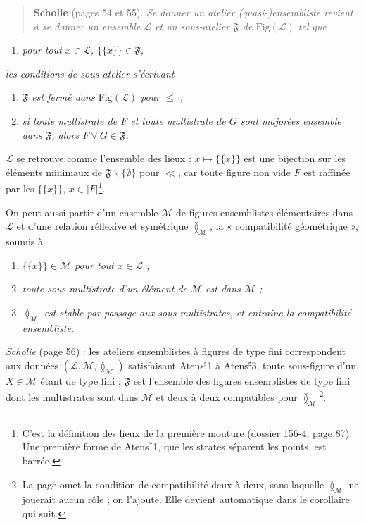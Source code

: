 \documentclass[11pt,a4paper]{article}
\begin{document}
\begin{quote}
\textbf{Scholie} (pages 54 et 55). \emph{Se donner un atelier (quasi-)ensembliste
revient à se donner un ensemble $\mathcal{L}$ et un sous-atelier $\mathfrak{F}$
de $\mathrm{Fig}(\mathcal{L})$ tel que}
\end{quote}
\begin{enumerate}
\item[Atens$^{*}$1] \emph{pour tout $x \in \mathcal{L}$, $\lbrace \lbrace x
\rbrace \rbrace \in \mathfrak{F}$,}
\end{enumerate}
\emph{les conditions de sous-atelier s'écrivant}
\begin{enumerate}
\item[Atens$^{*}$2] \emph{$\mathfrak{F}$ est fermé dans $\mathrm{Fig}(\mathcal{L})$
pour $\leq$ ;}
\item[Atens$^{*}$3] \emph{si toute multistrate de $F$ et toute multistrate de $G$
sont majorées ensemble dans $\mathfrak{F}$, alors $F \vee G \in \mathfrak{F}$.}
\end{enumerate}

$\mathcal{L}$ se retrouve comme l'ensemble des lieux : $x \mapsto \lbrace \lbrace
x \rbrace \rbrace$ est une bijection sur les éléments minimaux de $\mathfrak{F}
\smallsetminus \lbrace \emptyset \rbrace$ pour $\ll$, car toute figure non vide
$F$ est raffinée par les $\lbrace \lbrace x \rbrace \rbrace$, $x \in
|F|$\footnote{C'est la définition des lieux de la première mouture (dossier
156-4, page 87). Une première forme de Atens$^{*}$1, que les strates séparent les
points, est barrée.}.

On peut aussi partir d'un ensemble $\mathcal{M}$ de figures ensemblistes
élémentaires dans $\mathcal{L}$ et d'une relation réflexive et symétrique
$\between_{\mathcal{M}}$, la « compatibilité géométrique », soumis à
\begin{enumerate}
\item[Atens$^{\sharp}$1] \emph{$\lbrace \lbrace x \rbrace \rbrace \in \mathcal{M}$
pour tout $x \in \mathcal{L}$ ;}
\item[Atens$^{\sharp}$2] \emph{toute sous-multistrate d'un élément de
$\mathcal{M}$ est dans $\mathcal{M}$ ;}
\item[Atens$^{\sharp}$3] \emph{$\between_{\mathcal{M}}$ est stable par passage aux
sous-multistrates, et entraîne la compatibilité ensembliste.}
\end{enumerate}
\emph{Scholie} (page 56) : les ateliers ensemblistes à figures de type fini
correspondent aux données $(\mathcal{L}, \mathcal{M}, \between_{\mathcal{M}})$
satisfaisant Atens$^{\sharp}$1 à Atens$^{\sharp}$3, toute sous-figure d'un $X \in
\mathcal{M}$ étant de type fini ; $\mathfrak{F}$ est l'ensemble des figures
ensemblistes de type fini dont les multistrates sont dans $\mathcal{M}$ et deux
à deux compatibles pour $\between_{\mathcal{M}}$\footnote{La page omet la
condition de compatibilité deux à deux, sans laquelle $\between_{\mathcal{M}}$ ne
jouerait aucun rôle ; on l'ajoute. Elle devient automatique dans le corollaire
qui suit.}.
\end{document}
